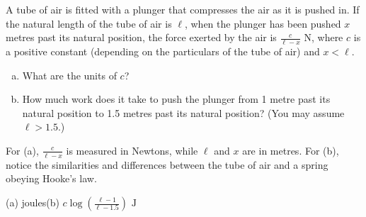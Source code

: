 \begin{Mquestion}
A tube of air is fitted with a plunger that compresses the air as it is pushed in. If the natural length of the tube of air is $\ell$, when the plunger has been pushed  $x$ metres past its natural position, the force exerted by the air is $\frac{c}{\ell-x}$ N, where $c$ is a positive constant (depending on the particulars of the tube of air) and $x<\ell$.
\begin{center}
\end{center}
\begin{enumerate}[(a)]
\item What are the units of $c$?
\item How much work does it take to push the plunger from 1 metre past its natural position to 1.5 metres past its natural position? (You may assume $\ell>1.5$.)
\end{enumerate}
\end{Mquestion}
\begin{hint}
For (a), $\frac{c}{\ell-x}$ is measured in Newtons, while $\ell$ and $x$ are in metres. For (b), notice the similarities and differences between the tube of air and a spring obeying Hooke's law.
\end{hint}
\begin{answer}
(a) joules\qquad (b) $\displaystyle c\log\left(\frac{\ell-1}{\ell-1.5}\right)\text{ J}$
\end{answer}
